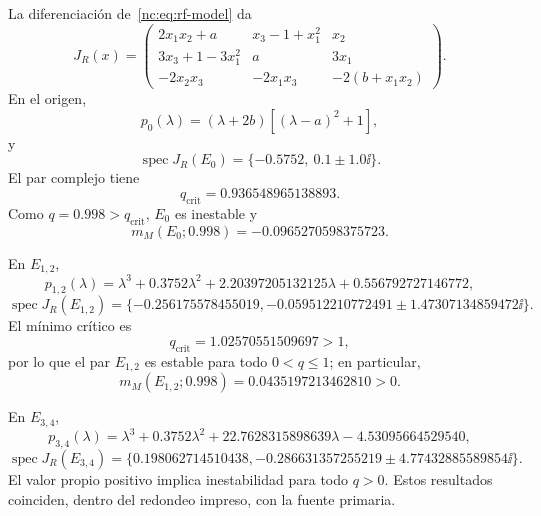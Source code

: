 La diferenciación de~\eqref{nc:eq:rf-model} da
\begin{equation}
 J_R(x)=
 \begin{pmatrix}
 2x_1x_2+a&x_3-1+x_1^2&x_2\\
 3x_3+1-3x_1^2&a&3x_1\\
 -2x_2x_3&-2x_1x_3&-2(b+x_1x_2)
 \end{pmatrix}.
 \label{nc:eq:rf-jacobian}
\end{equation}
En el origen,
\begin{equation}
 p_0(\lambda)=(\lambda+2b)\left[(\lambda-a)^2+1\right],
\end{equation}
y
\begin{equation}
 \operatorname{spec}J_R(E_0)=
 \{-0.5752,\ 0.1\pm1.0\ii\}.
\end{equation}
El par complejo tiene
\begin{equation}
 q_{\mathrm{crit}}=0.936548965138893.
\end{equation}
Como \(q=0.998>q_{\mathrm{crit}}\), \(E_0\) es inestable y
\begin{equation}
 m_M(E_0;0.998)=-0.0965270598375723.
\end{equation}

En \(E_{1,2}\),
\begin{equation}
 p_{1,2}(\lambda)=
 \lambda^3+0.3752\lambda^2
 +2.20397205132125\lambda+0.556792727146772,
\end{equation}
\begin{equation}
 \operatorname{spec}J_R(E_{1,2})=
 \{-0.256175578455019,
 -0.059512210772491\pm1.47307134859472\ii\}.
\end{equation}
El mínimo crítico es
\begin{equation}
 q_{\mathrm{crit}}=1.02570551509697>1,
\end{equation}
por lo que el par \(E_{1,2}\) es estable para todo \(0<q\leq1\); en particular,
\begin{equation}
 m_M(E_{1,2};0.998)=0.0435197213462810>0.
\end{equation}

En \(E_{3,4}\),
\begin{equation}
 p_{3,4}(\lambda)=
 \lambda^3+0.3752\lambda^2
 +22.7628315898639\lambda-4.53095664529540,
\end{equation}
\begin{equation}
 \operatorname{spec}J_R(E_{3,4})=
 \{0.198062714510438,
 -0.286631357255219\pm4.77432885589854\ii\}.
\end{equation}
El valor propio positivo implica inestabilidad para todo \(q>0\). Estos
resultados coinciden, dentro del redondeo impreso, con la fuente primaria.

